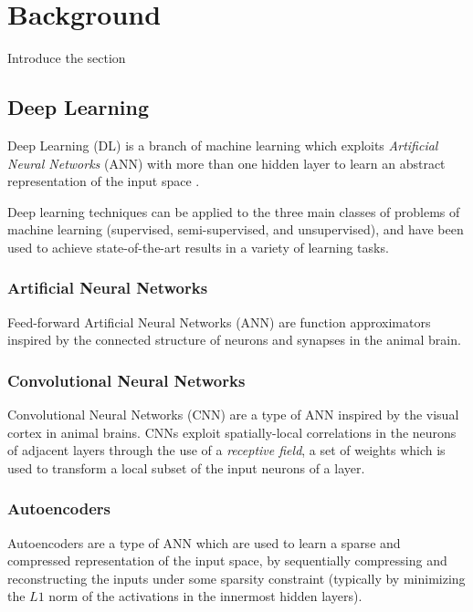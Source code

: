 \chapter{Background}
\label{ch1_intro}
\thispagestyle{empty}

\vspace{0.5cm}

\noindent Introduce the section

\section{Deep Learning} \label{s:DL}
Deep Learning (DL) is a branch of machine learning which exploits \textit{Artificial 
Neural Networks} (ANN) with more than one hidden layer to learn an abstract 
representation of the input space \cite{lecun2015deep}. 

Deep learning techniques can be applied to the three main classes of problems 
of machine learning (supervised, semi-supervised, and unsupervised), and have 
been used to achieve state-of-the-art results in a variety of learning tasks.

\subsection{Artificial Neural Networks}
Feed-forward Artificial Neural Networks (ANN) are function approximators 
inspired by the connected structure of neurons and synapses in the animal brain.

\subsection{Convolutional Neural Networks}
Convolutional Neural Networks (CNN) are a type of ANN inspired by the visual 
cortex in animal brains.
CNNs exploit spatially-local correlations in the neurons of adjacent 
layers through the use of a \textit{receptive field}, a set of weights which is 
used to transform a local subset of the input neurons of a layer.


\subsection{Autoencoders}
Autoencoders are a type of ANN which are used to learn a sparse and compressed 
representation of the input space, by sequentially compressing and 
reconstructing the inputs under some sparsity constraint (typically by 
minimizing the $L1$ norm of the activations in the innermost hidden layers).


